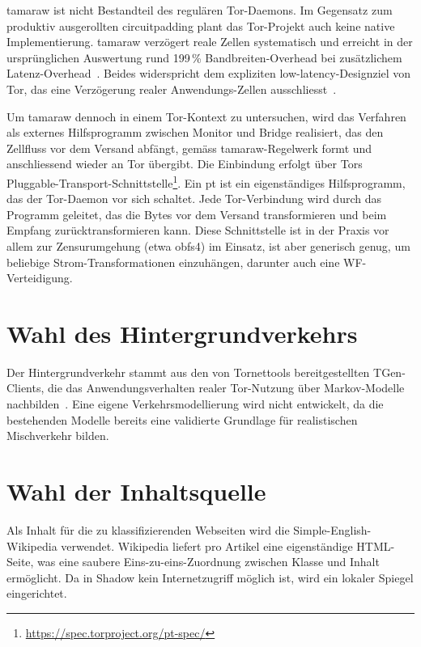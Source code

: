 \gls{tamaraw} ist nicht Bestandteil des regulären Tor-Daemons.
Im Gegensatz zum produktiv ausgerollten \gls{circuitpadding} plant das Tor-Projekt auch keine native Implementierung.
\gls{tamaraw} verzögert reale Zellen systematisch und erreicht in der ursprünglichen Auswertung rund 199\,\% Bandbreiten-Overhead bei zusätzlichem Latenz-Overhead~\cite{cai2014systematic}.
Beides widerspricht dem expliziten low-latency-Designziel von Tor, das eine Verzögerung realer Anwendungs-Zellen ausschliesst~\cite{kadianakis2021tor}.

Um \gls{tamaraw} dennoch in einem Tor-Kontext zu untersuchen, wird das Verfahren als externes Hilfsprogramm zwischen Monitor und Bridge realisiert, das den Zellfluss vor dem Versand abfängt, gemäss \gls{tamaraw}-Regelwerk formt und anschliessend wieder an Tor übergibt.
Die Einbindung erfolgt über Tors Pluggable-Transport-Schnittstelle\footnote{\url{https://spec.torproject.org/pt-spec/}}.
Ein \gls{pt} ist ein eigenständiges Hilfsprogramm, das der Tor-Daemon vor sich schaltet.
Jede Tor-Verbindung wird durch das Programm geleitet, das die Bytes vor dem Versand transformieren und beim Empfang zurücktransformieren kann.
Diese Schnittstelle ist in der Praxis vor allem zur Zensurumgehung (etwa obfs4) im Einsatz, ist aber generisch genug, um beliebige Strom-Transformationen einzuhängen, darunter auch eine WF-Verteidigung.

\section{Wahl des Hintergrundverkehrs}
\label{sec:konzepte_hintergrundverkehr}

Der Hintergrundverkehr stammt aus den von Tornettools bereitgestellten TGen-Clients, die das Anwendungsverhalten realer Tor-Nutzung über Markov-Modelle nachbilden~\cite{neverenough-sec2021}.
Eine eigene Verkehrsmodellierung wird nicht entwickelt, da die bestehenden Modelle bereits eine validierte Grundlage für realistischen Mischverkehr bilden.

\section{Wahl der Inhaltsquelle}
\label{sec:konzepte_inhaltsquelle}

Als Inhalt für die zu klassifizierenden Webseiten wird die Simple-English-Wikipedia verwendet.
Wikipedia liefert pro Artikel eine eigenständige HTML-Seite, was eine saubere Eins-zu-eins-Zuordnung zwischen Klasse und Inhalt ermöglicht.
Da in Shadow kein Internetzugriff möglich ist, wird ein lokaler Spiegel eingerichtet.


